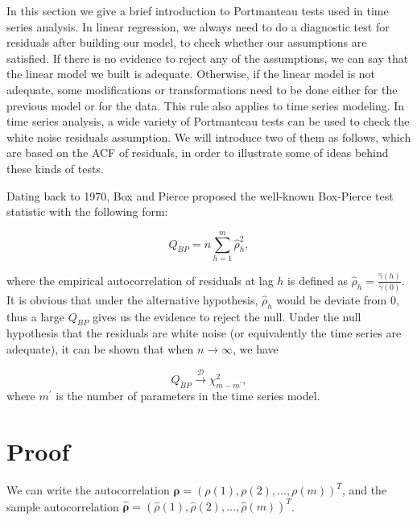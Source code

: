 \documentclass[]{book}
\theoremstyle{definition}
\theoremstyle{definition}
\theoremstyle{definition}
\theoremstyle{remark}
\begin{document}
{In this section we give a brief introduction to Portmanteau tests used
in time series analysis. In linear regression, we always need to do a
diagnostic test for residuals after building our model, to check whether
our assumptions are satisfied. If there is no evidence to reject any of
the assumptions, we can say that the linear model we built is adequate.
Otherwise, if the linear model is not adequate, some modifications or
transformations need to be done either for the previous model or for the
data. This rule also applies to time series modeling. In time series
analysis, a wide variety of Portmanteau tests can be used to check the
white noise residuals assumption. We will introduce two of them as
follows, which are based on the ACF of residuals, in order to illustrate
some of ideas behind these kinds of tests.

Dating back to 1970, Box and Pierce proposed the well-known Box-Pierce
test statistic with the following form:

\[Q_{BP} = n\sum_{h =1}^m \hat{\rho}_h^2,\]

where the empirical autocorrelation of residuals at lag \(h\) is defined
as \(\hat{\rho}_h = \frac{\hat{\gamma}(h)}{\hat{\gamma}(0)}\). It is
obvious that under the alternative hypothesis, \(\hat{\rho}_h\) would be
deviate from \(0\), thus a large \(Q_{BP}\) gives us the evidence to
reject the null. Under the null hypothesis that the residuals are white
noise (or equivalently the time series are adequate), it can be shown
that when \(n \to \infty\), we have

\[Q_{BP} \overset{\mathcal{D}}{\to} \chi^2_{m - m^{\prime}},\] where
\(m^{\prime}\) is the number of parameters in the time series model.

\hypertarget{proof}{%
\section{Proof}\label{proof}}

We can write the autocorrelation
\(\bm{\rho} = \left(\rho(1), \rho(2), \dots, \rho(m)\right)^T\), and the
sample autocorrelation
\(\bm{\hat{\rho}} = \left(\hat{\rho}(1), \hat{\rho}(2), \dots, \hat{\rho}(m)\right)^T\).

}
\end{document}
